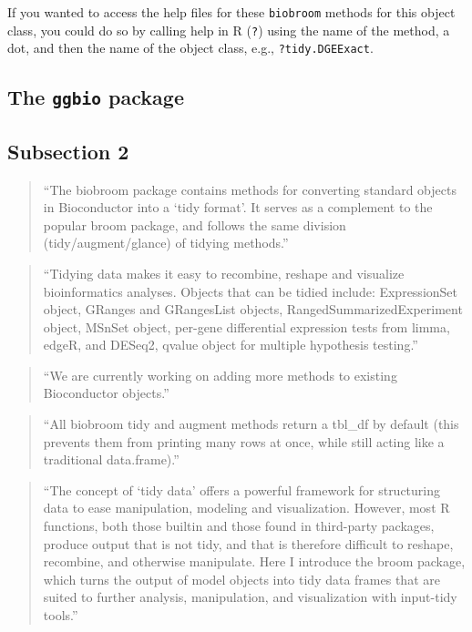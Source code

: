 \documentclass[]{tufte-book}
\begin{document}
If you wanted to access the help files for these \texttt{biobroom} methods for this
object class, you could do so by calling help in R (\texttt{?}) using the name of the
method, a dot, and then the name of the object class, e.g., \texttt{?tidy.DGEExact}.

\hypertarget{the-ggbio-package}{%
\subsection{\texorpdfstring{The \texttt{ggbio} package}{The ggbio package}}\label{the-ggbio-package}}

\hypertarget{subsection-2-7}{%
\subsection{Subsection 2}\label{subsection-2-7}}

\begin{quote}
``The biobroom package contains methods for converting standard objects in Bioconductor into a `tidy format'. It serves as a complement to the popular broom package, and follows the same division (tidy/augment/glance) of tidying methods.''
\citep{biobroom}
\end{quote}

\begin{quote}
``Tidying data makes it easy to recombine, reshape and visualize bioinformatics analyses. Objects that can be tidied include: ExpressionSet object,
GRanges and GRangesList objects, RangedSummarizedExperiment object, MSnSet object,
per-gene differential expression tests from limma, edgeR, and DESeq2, qvalue object for multiple hypothesis testing.'' \citep{biobroom}
\end{quote}

\begin{quote}
``We are currently working on adding more methods to existing Bioconductor objects.'' \citep{biobroom}
\end{quote}

\begin{quote}
``All biobroom tidy and augment methods return a tbl\_df by default (this prevents them from printing many rows at once, while still acting like a traditional data.frame).'' \citep{biobroom}
\end{quote}

\begin{quote}
``The concept of `tidy data' offers a powerful framework for structuring data
to ease manipulation, modeling and visualization. However, most R functions,
both those builtin and those found in third-party packages, produce output that
is not tidy, and that is therefore difficult to reshape, recombine, and
otherwise manipulate. Here I introduce the broom package, which turns the output
of model objects into tidy data frames that are suited to further analysis,
manipulation, and visualization with input-tidy tools.'' \citep{robinson2014broom}
\end{quote}
\end{document}
